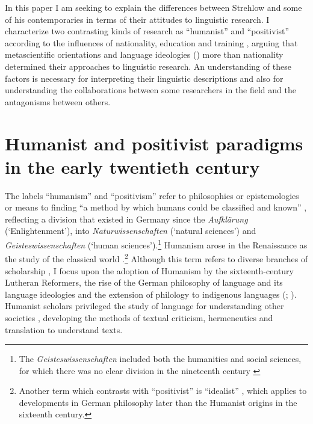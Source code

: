 \documentclass[english,output=paper,colorlinks,citecolor=brown]{../langscibook}
\begin{document}
 In this paper I am seeking to explain the differences between Strehlow and some of his contemporaries in terms of their attitudes to linguistic research. I characterize two contrasting kinds of research as ``humanist'' and ``positivist'' according to the influences of nationality, education and training \citep[94]{Errington2008}, arguing that metascientific orientations and language ideologies (\citealt{MooreForthcoming}) more than nationality determined their approaches to linguistic research. An understanding of these factors is necessary for interpreting their linguistic descriptions and also for understanding the collaborations between some researchers in the field and the antagonisms between others.  
 
\section{Humanist and positivist paradigms in the early twentieth century}

The labels ``humanism'' and ``positivism'' refer to philosophies or epistemologies or means to finding “a method by which humans could be classified and known” \citep[186]{Zimmerman2001}, reflecting a division that existed in Germany since the \textit{Aufklärung} (`Enlightenment'), into \textit{Naturwissenschaften} (`natural sciences') and \textit{Geisteswissenschaften} (`human sciences').\footnote{The \textit{Geisteswissenschaften} included both the humanities and social sciences, for which there was no clear division in the nineteenth century \citep[282]{Adams1998}} Humanism arose in the Renaissance as the study of the classical world \citep[172]{Giustiniani1985}.\footnote{Another term which contrasts with ``positivist'' is ``idealist'' \citep{Vossler1904}, which applies to developments in German philosophy later than the Humanist origins in the sixteenth century.} Although this term refers to diverse branches of scholarship \citep[258]{Adams1998}, I focus upon the adoption of Humanism by the sixteenth-century Lutheran Reformers, the rise of the German philosophy of language and its language ideologies and the extension of philology to indigenous languages (\citealt[328]{MooreRíos-Castaño2018}; \citealt{MooreForthcoming}). Humanist scholars privileged the study of language for understanding other societies \citep[53]{Zimmerman2001}, developing the methods of textual criticism, hermeneutics and translation to understand texts.
\end{document}
